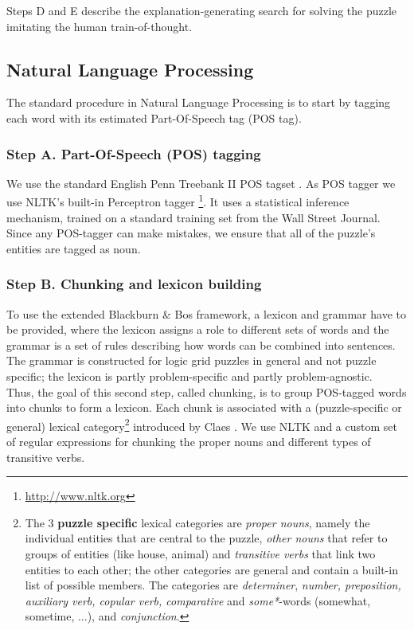 Steps D and E describe the explanation-generating search for solving the puzzle imitating the human train-of-thought.

\subsection{Natural Language Processing} \label{nlp}
The standard procedure in Natural Language Processing is to start by tagging each word with its estimated Part-Of-Speech tag (POS tag). 

\subsubsection*{Step A. Part-Of-Speech (POS) tagging} \label{pos_tagging}
We use the standard English Penn Treebank II POS tagset \cite{marcus1993building}. As POS tagger we use NLTK's built-in Perceptron tagger \footnote{\url{http://www.nltk.org}}. It uses a statistical inference mechanism, trained on a standard training set from the Wall Street Journal. Since any POS-tagger can make mistakes, we ensure that all of the puzzle’s entities are tagged as noun.

\subsubsection*{Step B. Chunking and lexicon building} \label{chunking_lexicon}
To use the extended Blackburn \& Bos framework, a lexicon and grammar have to be provided, where the lexicon assigns a role to different sets of words and the grammar is a set of rules describing how words can be combined into sentences. The grammar is constructed for logic grid puzzles in general and not puzzle specific; the lexicon is partly problem-specific and partly problem-agnostic.\\

Thus, the goal of this second step, called chunking, is to group POS-tagged words into chunks to form a lexicon. Each chunk is associated with a (puzzle-specific or general) lexical category\footnote{The 3 \textbf{puzzle specific} lexical categories are \textit{proper nouns}, namely the individual entities that are central to the puzzle, \textit{other nouns} that refer to groups of entities (like house, animal) and \textit{transitive verbs} that link two entities to each other; the other categories are general and contain a built-in list of possible members. The categories are \textit{determiner},\textit{ number, preposition, auxiliary verb, copular verb, comparative} and \textit{some*}-words (somewhat, sometime, ...), and \textit{conjunction}.} introduced by Claes \cite{msc/Claes17}. We use NLTK and a custom set of regular expressions for chunking the proper nouns and different types of transitive verbs.\\ 


